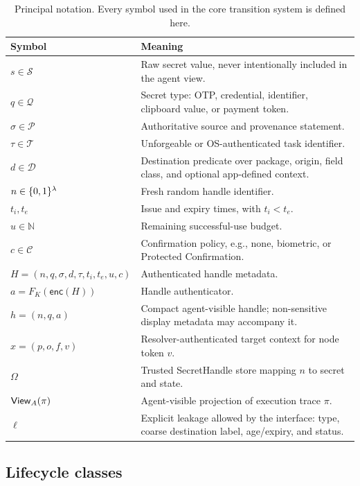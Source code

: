 \begin{table}[htbp]
\centering
\caption{Principal notation. Every symbol used in the core transition system is defined here.}
\label{tab:notation}
\begin{tabularx}{\textwidth}{@{}lX@{}}
\toprule
Symbol & Meaning \\
\midrule
$s\in\mathcal{S}$ & Raw secret value, never intentionally included in the agent view. \\
$q\in\mathcal{Q}$ & Secret type: OTP, credential, identifier, clipboard value, or payment token. \\
$\sigma\in\mathcal{P}$ & Authoritative source and provenance statement. \\
$\tau\in\mathcal{T}$ & Unforgeable or OS-authenticated task identifier. \\
$d\in\mathcal{D}$ & Destination predicate over package, origin, field class, and optional app-defined context. \\
$n\in\{0,1\}^\lambda$ & Fresh random handle identifier. \\
$t_i,t_e$ & Issue and expiry times, with $t_i<t_e$. \\
$u\in\mathbb{N}$ & Remaining successful-use budget. \\
$c\in\mathcal{C}$ & Confirmation policy, e.g., none, biometric, or Protected Confirmation. \\
$H=(n,q,\sigma,d,\tau,t_i,t_e,u,c)$ & Authenticated handle metadata. \\
$a=F_K(\mathsf{enc}(H))$ & Handle authenticator. \\
$h=(n,q,a)$ & Compact agent-visible handle; non-sensitive display metadata may accompany it. \\
$x=(p,o,f,v)$ & Resolver-authenticated target context for node token $v$. \\
$\Omega$ & Trusted SecretHandle store mapping $n$ to secret and state. \\
$\mathsf{View}_A(\pi)$ & Agent-visible projection of execution trace $\pi$. \\
$\ell$ & Explicit leakage allowed by the interface: type, coarse destination label, age/expiry, and status. \\
\bottomrule
\end{tabularx}
\end{table}

\subsection{Lifecycle classes}

